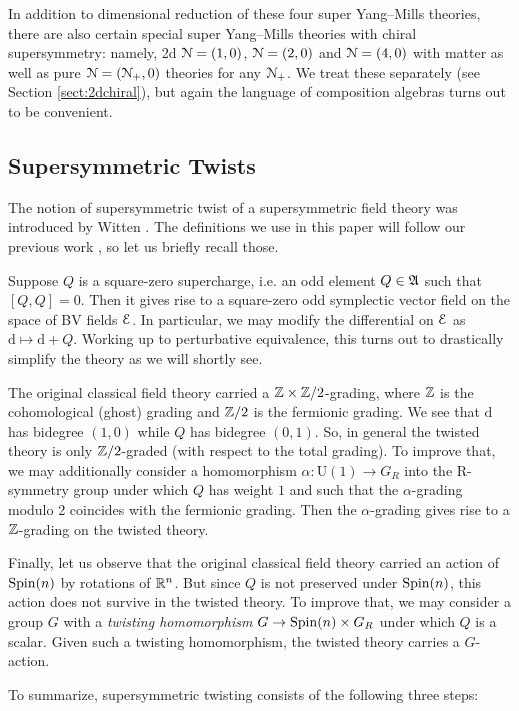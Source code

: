 \documentclass[10pt, oneside]{article}
\renewcommand{\U}{\mathrm{U}}
\begin{document}
In addition to dimensional reduction of these four super Yang--Mills theories, there are also certain special super Yang--Mills theories with chiral supersymmetry: namely, 2d $\mathcal N=(1, 0)$, $\mathcal N=(2, 0)$ and $\mathcal N=(4, 0)$ with matter as well as pure $\mathcal N=(\mathcal N_+, 0)$ theories for any $\mathcal N_+$. We treat these separately (see Section \ref{sect:2dchiral}), but again the language of composition algebras turns out to be convenient.

\subsection*{Supersymmetric Twists}

The notion of supersymmetric twist of a supersymmetric field theory was introduced by Witten \cite{WittenTQFT}. The definitions we use in this paper will follow our previous work \cite{ElliottSafronov}, so let us briefly recall those.

Suppose $Q$ is a square-zero supercharge, i.e. an odd element $Q\in\mathfrak A$ such that $[Q, Q]=0$. Then it gives rise to a square-zero odd symplectic vector field on the space of BV fields $\mathcal E$. In particular, we may modify the differential on $\mathcal E$ as $\mathrm{d}\mapsto \mathrm{d}+Q$. Working up to perturbative equivalence, this turns out to drastically simplify the theory as we will shortly see.

The original classical field theory carried a $\mathbb Z\times\mathbb Z/2$-grading, where $\mathbb Z$ is the cohomological (ghost) grading and $\mathbb Z/2$ is the fermionic grading. We see that $\mathrm{d}$ has bidegree $(1, 0)$ while $Q$ has bidegree $(0, 1)$. So, in general the twisted theory is only $\mathbb Z/2$-graded (with respect to the total grading). To improve that, we may additionally consider a homomorphism $\alpha\colon \U(1)\rightarrow G_R$ into the R-symmetry group under which $Q$ has weight $1$ and such that the $\alpha$-grading modulo 2 coincides with the fermionic grading. Then the $\alpha$-grading gives rise to a $\mathbb Z$-grading on the twisted theory.

Finally, let us observe that the original classical field theory carried an action of $\mathrm{Spin}(n)$ by rotations of $\mathbb R^n$. But since $Q$ is not preserved under $\mathrm{Spin}(n)$, this action does not survive in the twisted theory. To improve that, we may consider a group $G$ with a \emph{twisting homomorphism} $G\rightarrow \mathrm{Spin}(n)\times G_R$ under which $Q$ is a scalar. Given such a twisting homomorphism, the twisted theory carries a $G$-action.

To summarize, supersymmetric twisting consists of the following three steps:
\end{document}
